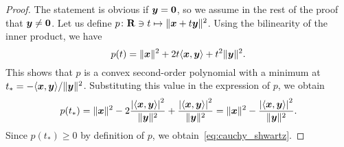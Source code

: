 \begin{proof}
    The statement is obvious if $\mathbf{\boldsymbol{y}} = \mathbf{\boldsymbol{0}}$,
    so we assume in the rest of the proof that $\mathbf{\boldsymbol{y}} \neq \mathbf{\boldsymbol{0}}$.
    Let us define $p\colon \mathbf R \ni t \mapsto \lVert\mathbf{\boldsymbol{x}} + t \mathbf{\boldsymbol{y}}\rVert^2$.
    Using the bilinearity of the inner product,
    we have
    \[
        p(t) = \lVert\mathbf{\boldsymbol{x}}\rVert^2 + 2 t \langle\mathbf{\boldsymbol{x}}, \mathbf{\boldsymbol{y}}\rangle + t^2 \lVert\mathbf{\boldsymbol{y}}\rVert^2.
    \]
    This shows that $p$ is a convex second-order polynomial with a minimum at $t_* = - \langle\mathbf{\boldsymbol{x}}, \mathbf{\boldsymbol{y}}\rangle / \lVert\mathbf{\boldsymbol{y}}\rVert^2$.
    Substituting this value in the expression of $p$,
    we obtain
    \[
        p(t_*) = \norm{\vect x}^2 - 2 \frac{\abs[big]{\ip{\vect x, \vect y}}^2}{\norm{\vect y}^2} +  \frac{\abs[big]{\ip{\vect x, \vect y}}^2}{\norm{\vect y}^2}
        = \norm{\vect x}^2 - \frac{\abs[big]{\ip{\vect x, \vect y}}^2}{\norm{\vect y}^2}.
    \]
    Since $p(t_*) \geq 0$ by definition of $p$,
    we obtain~\eqref{eq:cauchy_shwartz}.
\end{proof}


